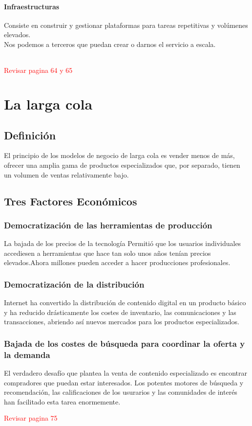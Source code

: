 \documentclass[11pt]{book}
\begin{document}
\subsubsection{Infraestructuras}
Consiste en construir y gestionar plataformas para tareas repetitivas y volúmenes elevados.\\
Nos podemos a terceros que puedan crear o darnos el servicio a escala.\\\\

\begin{flushright}
\textcolor{red}{Revisar pagina 64 y 65}
\end{flushright}
\chapter{La larga cola}
\section{Definición}
El principio de los modelos de negocio de larga cola es vender menos de más, ofrecer una amplia gama de productos especializados que, por separado, tienen un volumen de ventas relativamente bajo.
\section{Tres Factores Económicos}
\subsection{Democratización de las herramientas de producción}
La bajada de los precios de la tecnología Permitió que los usuarios individuales accediesen a herramientas que hace tan solo unos años tenían precios elevados.Ahora millones pueden acceder a hacer producciones profesionales.
\subsection{Democratización de la distribución}
Internet ha convertido la distribución de contenido digital en un producto básico y ha reducido drásticamente los costes de inventario, las comunicaciones y las transacciones, abriendo así nuevos mercados para los productos especializados.
\subsection{Bajada de los costes de búsqueda para coordinar la oferta y la demanda}
El verdadero desafío que plantea la venta de contenido especializado es encontrar compradores que puedan estar interesados. Los potentes motores de búsqueda y recomendación, las calificaciones de los usurarios y las comunidades de interés han facilitado esta tarea enormemente.
\begin{flushright}
\textcolor{red}{Revisar pagina 75}
\end{flushright}
\end{document}
